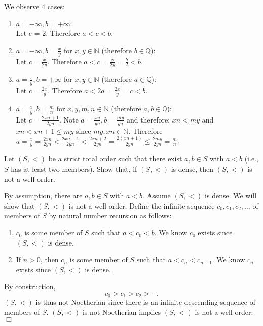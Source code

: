 \documentclass[11pt,fleqn]{article}
\newcommand{\be}{\begin{enumerate}}
\newcommand{\ee}{\end{enumerate}}
\newcommand{\sglsp}{\ }
\newenvironment{proof}{\par\noindent{\bf Proof\sglsp}}{\hfill$\Box$}
\begin{document}
We observe 4 cases:
\be
	\item $a = -\infty, b = +\infty$: \\
		Let c = 2.
		Therefore $a < c < b$.
	\item $a = -\infty, b = \frac{x}{y}$ for $x,y \in \mathbb{N}$ (therefore $b \in \mathbb{Q}$): \\
		Let $c = \frac{x}{2y}$.
		Therefore $a < c = \frac{x}{2y} = \frac{b}{2} < b$.
	\item $a = \frac{x}{y}, b = +\infty$ for $x,y \in \mathbb{N}$ (therefore $a \in \mathbb{Q}$): \\
		Let $c = \frac{2x}{y}$.
		Therefore $a < 2a = \frac{2x}{y} = c < b$.
	\item $a = \frac{x}{y}, b = \frac{m}{n}$ for $x,y,m,n \in \mathbb{N}$ (therefore $a,b \in \mathbb{Q}$): \\
		Let $c = \frac{2xn+1}{2yn}$.
		Note $a = \frac{xn}{yn}, b = \frac{my}{yn}$ and therefore: $xn < my$ and $xn < xn + 1 \leq my$ since $my, xn \in \mathbb{N}$.
		Therefore $a = \frac{x}{y} = \frac{2xn}{2yn} < \frac{2xn+1}{2yn} < \frac{2xn+2}{2yn} = \frac{2(xn+1)}{2yn} \leq \frac{2my}{2yn} = \frac{m}{n}$.
\ee



  \item Let $(S,<)$ be a strict total order such
    that there exist $a,b \in S$ with $a < b$ (i.e., $S$ has at least
    two members).  Show that, if $(S,<)$ is dense, then $(S,<)$ is not
    a well-order.

  \bigskip

\begin{proof}
By assumption, there are $a,b \in S$ with $a < b$.  Assume $(S,<)$ is
dense.  We will show that $(S,<)$ is not a well-order.  Define the
infinite sequence $c_0,c_1,c_2, \ldots$ of members of $S$ by natural
number recursion as follows:

\be

  \item $c_0$ is some member of $S$ such that $a < c_0 < b$.  We know
    $c_0$ exists since $(S,<)$ is dense.

  \item If $n > 0$, then $c_n$ is some member of $S$ such that $a <
    c_n < c_{n-1}$.  We know $c_n$ exists since $(S,<)$ is dense.

\ee

By construction, \[c_0 > c_1 > c_2 > \cdots .\] $(S,<)$ is thus not
Noetherian since there is an infinite descending sequence of members
of $S$.  $(S,<)$ is not Noetherian implies $(S,<)$ is not a
well-order.
\end{proof}
\end{document}
